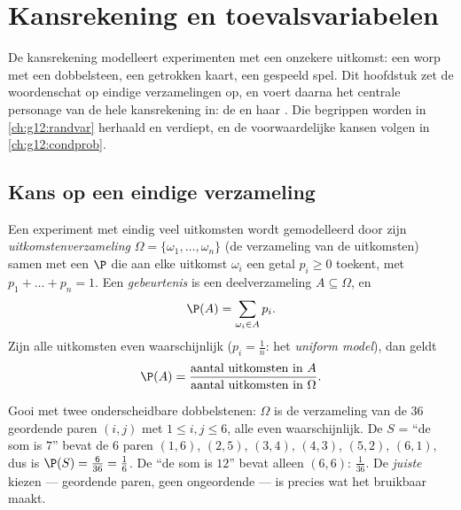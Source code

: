 \chapter{Kansrekening en toevalsvariabelen}\label{ch:g11:prob}

De kansrekening modelleert experimenten met een onzekere uitkomst: een worp
met een dobbelsteen, een getrokken kaart, een gespeeld spel. Dit hoofdstuk
zet de woordenschat op eindige verzamelingen op, en voert daarna het centrale
personage van de hele kansrekening in: de \emph{} en haar
\emph{}. Die begrippen worden in \cref{ch:g12:randvar}
herhaald en verdiept, en de voorwaardelijke kansen volgen in
\cref{ch:g12:condprob}.

\section{Kans op een eindige verzameling}

\begin{definition}[Kansmodel]\label{def:g11:prob:model}
Een experiment met eindig veel uitkomsten wordt gemodelleerd door zijn
\emph{uitkomstenverzameling}
$\Omega = \{\omega_1, \dots, \omega_n\}$ (de verzameling van de uitkomsten)
samen met een \emph{} $\P$ die aan elke uitkomst $\omega_i$ een getal
$p_i \geq 0$ toekent, met $p_1 + \dots + p_n = 1$. Een
\emph{gebeurtenis} is een deelverzameling
$A \subseteq \Omega$, en
\[
\P(A) = \sum_{\omega_i \in A} p_i .
\]
Zijn alle uitkomsten even waarschijnlijk ($p_i = \frac1n$: het \emph{uniform
model}), dan geldt
\[
\P(A) = \frac{\text{aantal uitkomsten in } A}
{\text{aantal uitkomsten in } \Omega}.
\]
\end{definition}

\begin{example}\label{ex:g11:prob:twodice}
Gooi met twee onderscheidbare dobbelstenen: $\Omega$ is de verzameling van
de $36$ geordende paren $(i, j)$ met $1 \leq i, j \leq 6$, alle even
waarschijnlijk. De  $S$ = ``de som is $7$'' bevat de $6$ paren
$(1,6)$, $(2,5)$, $(3,4)$, $(4,3)$, $(5,2)$, $(6,1)$, dus is
$\P(S) = \frac{6}{36} = \frac16$. De  ``de som is $12$'' bevat
alleen $(6,6)$:  $\frac{1}{36}$. De \emph{juiste} 
kiezen --- geordende paren, geen ongeordende --- is precies wat het  bruikbaar maakt.
\end{example}

